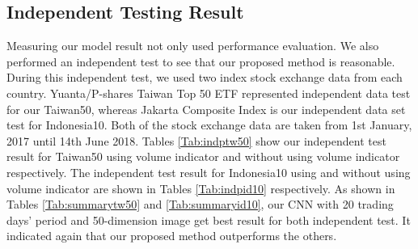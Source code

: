 \documentclass[10pt,twocolumn]{article}
\begin{document}
\subsection{Independent Testing Result}
Measuring our model result not only used performance evaluation. We also performed an independent test to see that our proposed method is reasonable. During this independent test, we used two index stock exchange data from each country. Yuanta/P-shares Taiwan Top 50 ETF represented independent data test for our Taiwan50, whereas Jakarta Composite Index is our independent data set test for Indonesia10. Both of the stock exchange data are taken from 1st January, 2017 until 14th June 2018. 
Tables \ref{Tab:indptw50} show our independent test result for Taiwan50 using volume indicator and without using volume indicator respectively. The independent test result for Indonesia10 using and without using volume indicator are shown in Tables \ref{Tab:indpid10} respectively. As shown in Tables \ref{Tab:summarytw50} and \ref{Tab:summaryid10}, our CNN with 20 trading days’ period and 50-dimension image get best result for both independent test. It indicated again that our proposed method outperforms the others.
 \begin{table}[H]
 \centering
 \caption{Summary result of Taiwan 50 with their best classifier for each trading days and image dimension.}
 \label{Tab:indptw50}
 \end{table}
 
\end{document}
